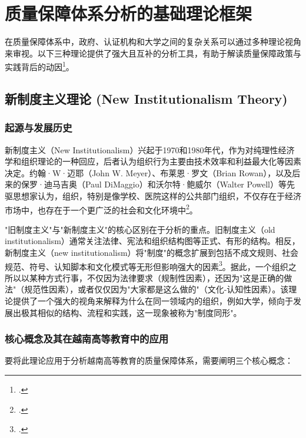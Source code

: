 

\section{质量保障体系分析的基础理论框架}
\label{sec:khung_ly_thuyet_nen_tang}

在质量保障体系中，政府、认证机构和大学之间的复杂关系可以通过多种理论视角来审视。以下三种理论提供了强大且互补的分析工具，有助于解读质量保障政策与实践背后的动因\footcite{OxfordResearch}。

\subsection{新制度主义理论 (New Institutionalism Theory)}
\label{subsec:tan_the_che_nen_teng}

\subsubsection{起源与发展历史}
新制度主义（New Institutionalism）兴起于1970和1980年代，作为对纯理性经济学和组织理论的一种回应，后者认为组织行为主要由技术效率和利益最大化等因素决定。约翰·W·迈耶（John W. Meyer）、布莱恩·罗文（Brian Rowan），以及后来的保罗·迪马吉奥（Paul DiMaggio）和沃尔特·鲍威尔（Walter Powell）等先驱思想家认为，组织，特别是像学校、医院这样的公共部门组织，不仅存在于经济市场中，也存在于一个更广泛的社会和文化环境中\footcite{MeyerRowan1977}。

"旧制度主义"与"新制度主义"的核心区别在于分析的重点。旧制度主义（old institutionalism）通常关注法律、宪法和组织结构图等正式、有形的结构。相反，新制度主义（new institutionalism）将"制度"的概念扩展到包括不成文规则、社会规范、符号、认知脚本和文化模式等无形但影响强大的因素\footcite{MeyerPowell2020}。据此，一个组织之所以以某种方式行事，不仅因为法律要求（规制性因素），还因为"这是正确的做法"（规范性因素），或者仅仅因为"大家都是这么做的"（文化-认知性因素）。该理论提供了一个强大的视角来解释为什么在同一领域内的组织，例如大学，倾向于发展出极其相似的结构、流程和实践，这一现象被称为"制度同形"。

\subsubsection{核心概念及其在越南高等教育中的应用}

要将此理论应用于分析越南高等教育的质量保障体系，需要阐明三个核心概念：

